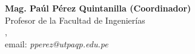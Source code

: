 \begin{center}
\textbf{Mag. Paúl Pérez Quintanilla (Coordinador)}\\
Profesor de la Facultad de Ingenierí­as\\
\institution, \city\\
email: \textit{pperez@utpaqp.edu.pe}
\end{center}